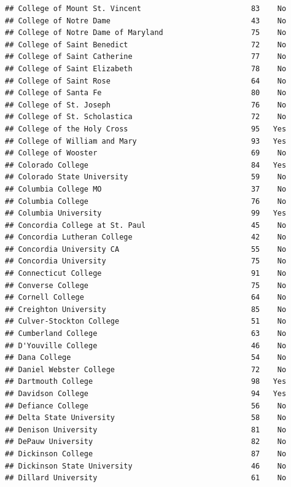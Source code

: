 \documentclass[
]{article}
\begin{document}
\begin{verbatim}
## College of Mount St. Vincent                         83    No
## College of Notre Dame                                43    No
## College of Notre Dame of Maryland                    75    No
## College of Saint Benedict                            72    No
## College of Saint Catherine                           77    No
## College of Saint Elizabeth                           78    No
## College of Saint Rose                                64    No
## College of Santa Fe                                  80    No
## College of St. Joseph                                76    No
## College of St. Scholastica                           72    No
## College of the Holy Cross                            95   Yes
## College of William and Mary                          93   Yes
## College of Wooster                                   69    No
## Colorado College                                     84   Yes
## Colorado State University                            59    No
## Columbia College MO                                  37    No
## Columbia College                                     76    No
## Columbia University                                  99   Yes
## Concordia College at St. Paul                        45    No
## Concordia Lutheran College                           42    No
## Concordia University CA                              55    No
## Concordia University                                 75    No
## Connecticut College                                  91    No
## Converse College                                     75    No
## Cornell College                                      64    No
## Creighton University                                 85    No
## Culver-Stockton College                              51    No
## Cumberland College                                   63    No
## D'Youville College                                   46    No
## Dana College                                         54    No
## Daniel Webster College                               72    No
## Dartmouth College                                    98   Yes
## Davidson College                                     94   Yes
## Defiance College                                     56    No
## Delta State University                               58    No
## Denison University                                   81    No
## DePauw University                                    82    No
## Dickinson College                                    87    No
## Dickinson State University                           46    No
## Dillard University                                   61    No

\end{verbatim}
\end{document}
